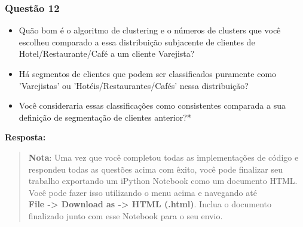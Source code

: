 \documentclass[11pt]{article}
\providecommand{\tightlist}{%
      \setlength{\itemsep}{0pt}\setlength{\parskip}{0pt}}
\begin{document}
    \subsubsection{Questão 12}\label{questuxe3o-12}

\begin{itemize}
\tightlist
\item
  Quão bom é o algoritmo de clustering e o números de clusters que você
  escolheu comparado a essa distribuição subjacente de clientes de
  Hotel/Restaurante/Café a um cliente Varejista?
\item
  Há segmentos de clientes que podem ser classificados puramente como
  'Varejistas' ou 'Hotéis/Restaurantes/Cafés' nessa distribuição?
\item
  Você consideraria essas classificações como consistentes comparada a
  sua definição de segmentação de clientes anterior?*
\end{itemize}

    \textbf{Resposta:}

    \begin{quote}
\textbf{Nota}: Uma vez que você completou todas as implementações de
código e respondeu todas as questões acima com êxito, você pode
finalizar seu trabalho exportando um iPython Notebook como um documento
HTML. Você pode fazer isso utilizando o menu acima e navegando até\\
\textbf{File -\textgreater{} Download as -\textgreater{} HTML (.html)}.
Inclua o documento finalizado junto com esse Notebook para o seu envio.
\end{quote}


    
    
    
    
\end{document}
